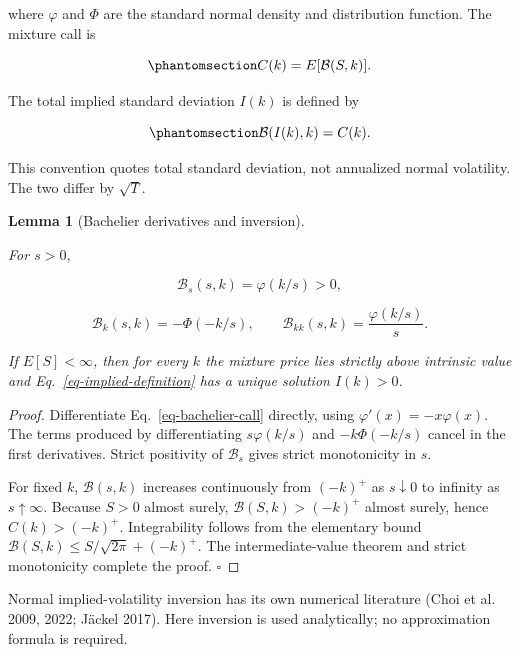 \documentclass[
  english,
  11pt,
  letterpaper,
  DIV=11,
  numbers=noendperiod]{scrartcl}
\theoremstyle{plain}
\theoremstyle{plain}
\theoremstyle{plain}
\newtheorem{lemma}{Lemma}[section]
\theoremstyle{plain}
\theoremstyle{remark}
\begin{document}
where \(\varphi\) and \(\Phi\) are the standard normal density and
distribution function. The mixture call is

\begin{equation}\protect\phantomsection\label{eq-mixture-call}{
C(k)=E[\mathcal B(S,k)].
}\end{equation}

The total implied standard deviation \(I(k)\) is defined by

\begin{equation}\protect\phantomsection\label{eq-implied-definition}{
\mathcal B(I(k),k)=C(k).
}\end{equation}

This convention quotes total standard deviation, not annualized normal
volatility. The two differ by \(\sqrt T\).

\begin{lemma}[Bachelier derivatives and
inversion]\protect\hypertarget{lem-bachelier-calculus}{}\label{lem-bachelier-calculus}

For \(s>0\),

\[
\mathcal B_s(s,k)=\varphi(k/s)>0,
\]

\[
\mathcal B_k(s,k)=-\Phi(-k/s),
\qquad
\mathcal B_{kk}(s,k)=\frac{\varphi(k/s)}{s}.
\]

If \(E[S]<\infty\), then for every \(k\) the mixture price lies strictly
above intrinsic value and Eq.~\ref{eq-implied-definition} has a unique
solution \(I(k)>0\).

\end{lemma}

\begin{proof}
Differentiate Eq.~\ref{eq-bachelier-call} directly, using
\(\varphi'(x)=-x\varphi(x)\). The terms produced by differentiating
\(s\varphi(k/s)\) and \(-k\Phi(-k/s)\) cancel in the first derivatives.
Strict positivity of \(\mathcal B_s\) gives strict monotonicity in
\(s\).

For fixed \(k\), \(\mathcal B(s,k)\) increases continuously from
\((-k)^+\) as \(s\downarrow0\) to infinity as \(s\uparrow\infty\).
Because \(S>0\) almost surely, \(\mathcal B(S,k)>(-k)^+\) almost surely,
hence \(C(k)>(-k)^+\). Integrability follows from the elementary bound
\(\mathcal B(S,k)\le S/\sqrt{2\pi}+(-k)^+\). The intermediate-value
theorem and strict monotonicity complete the proof. \(\square\)
\end{proof}

Normal implied-volatility inversion has its own numerical literature
(Choi et al. 2009, 2022; Jäckel 2017). Here inversion is used
analytically; no approximation formula is required.
\end{document}
